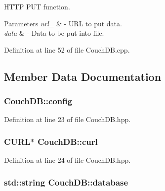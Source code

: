 H\+T\+TP P\+UT function. 


\begin{DoxyParams}{Parameters}
{\em url\+\_\+} & -\/ U\+RL to put data. \\
\hline
{\em data} & -\/ Data to be put into file. \\
\hline
\end{DoxyParams}


Definition at line 52 of file Couch\+D\+B.\+cpp.



\subsection{Member Data Documentation}
\subsubsection[{\texorpdfstring{config}{config}}]{ Couch\+D\+B\+::config\hspace{0.3cm}{\ttfamily [protected]}}\hypertarget{class_couch_d_b_ada3dd3c5112ccf493eafe278ce4a521c}{}\label{class_couch_d_b_ada3dd3c5112ccf493eafe278ce4a521c}


Definition at line 23 of file Couch\+D\+B.\+hpp.

\subsubsection[{\texorpdfstring{curl}{curl}}]{\setlength{\rightskip}{0pt plus 5cm}C\+U\+RL$\ast$ Couch\+D\+B\+::curl\hspace{0.3cm}{\ttfamily [protected]}}\hypertarget{class_couch_d_b_a85772e6420ce3521793da3427e573706}{}\label{class_couch_d_b_a85772e6420ce3521793da3427e573706}


Definition at line 24 of file Couch\+D\+B.\+hpp.

\subsubsection[{\texorpdfstring{database}{database}}]{\setlength{\rightskip}{0pt plus 5cm}std\+::string Couch\+D\+B\+::database\hspace{0.3cm}{\ttfamily [protected]}}\hypertarget{class_couch_d_b_a5951cb721e50d0b8d24c8fea625909ff}{}\label{class_couch_d_b_a5951cb721e50d0b8d24c8fea625909ff}


